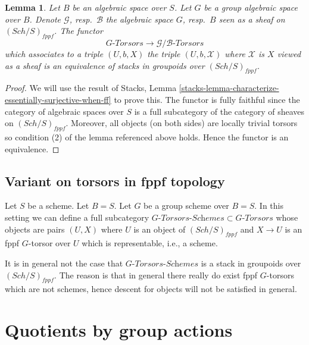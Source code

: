 \documentclass{stacks-project}
\theoremstyle{plain}
\newtheorem{lemma}[subsection]{Lemma}
\theoremstyle{definition}
\theoremstyle{remark}
\numberwithin{equation}{subsection}
\def\Sch{\mathit{Sch}}
\begin{document}
\begin{lemma}
\label{lemma-compare-torsors}
Let $B$ be an algebraic space over $S$. Let $G$ be a group algebraic
space over $B$. Denote $\mathcal{G}$, resp.\ $\mathcal{B}$ the algebraic
space $G$, resp.\ $B$ seen as a sheaf on $(\Sch/S)_{fppf}$.
The functor
$$
G\textit{-Torsors} \longrightarrow \mathcal{G}/\mathcal{B}\textit{-Torsors}
$$
which associates to a triple $(U, b, X)$ the triple
$(U, b, \mathcal{X})$ where $\mathcal{X}$ is $X$ viewed as a sheaf
is an equivalence of stacks in groupoids over $(\Sch/S)_{fppf}$.
\end{lemma}

\begin{proof}
We will use the result of
Stacks, Lemma \ref{stacks-lemma-characterize-essentially-surjective-when-ff}
to prove this. The functor is fully faithful since the category of
algebraic spaces over $S$ is a full subcategory of the category of
sheaves on $(\Sch/S)_{fppf}$.
Moreover, all objects (on both sides) are locally trivial torsors
so condition (2) of the lemma referenced above holds.
Hence the functor is an equivalence.
\end{proof}



\subsection{Variant on torsors in fppf topology}
\label{subsection-variant-fppf-torsors}

\noindent
Let $S$ be a scheme. Let $B = S$.
Let $G$ be a group scheme over $B = S$.
In this setting we can define a full subcategory
$G\textit{-Torsors-Schemes} \subset G\textit{-Torsors}$
whose objects are pairs $(U, X)$ where $U$ is an object of
$(\Sch/S)_{fppf}$ and $X \to U$ is an fppf
$G$-torsor over $U$ which is representable, i.e., a scheme.

\medskip\noindent
It is in general not the case that $G\textit{-Torsors-Schemes}$ is
a stack in groupoids over $(\Sch/S)_{fppf}$. The reason is
that in general there really do exist fppf $G$-torsors
which are not schemes, hence descent for objects will not be satisfied
in general.






\section{Quotients by group actions}
\label{section-group-quotient-stacks}
\end{document}
